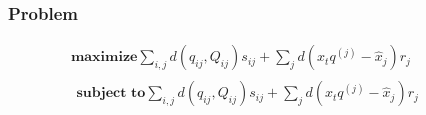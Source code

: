 \documentclass[10pt]{article}
\begin{document}
%
%
\subsubsection*{Problem}

\begin{equation}
\begin{array}{c}
\textbf{maximize} \sum_{i, j}{d(q_{ij}, Q_{ij})s_{ij}} + \sum_{j}{d(x_tq^{(j)} - \hat{x}_j)r_j}\\
\begin{array}{rcl}
\textbf{subject to} \sum_{i, j}{d(q_{ij}, Q_{ij})s_{ij}} + \sum_{j}{d(x_tq^{(j)} - \hat{x}_j)r_j} & \, & \\
\end{array}
\end{array}
\end{equation}
\end{document}
